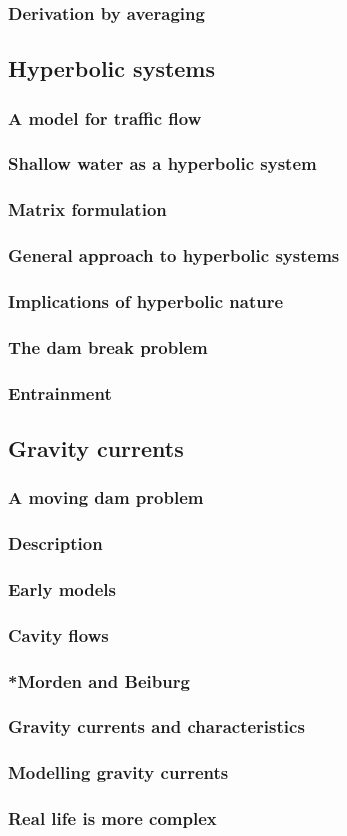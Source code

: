 \subsubsection{Derivation by averaging}

\subsection{Hyperbolic systems}
\subsubsection{A model for traffic flow}
\subsubsection{Shallow water as a hyperbolic system}
\subsubsection{Matrix formulation}
\subsubsection{General approach to hyperbolic systems}
\subsubsection{Implications of hyperbolic nature}
\subsubsection{The dam break problem}
\subsubsection{Entrainment}

\subsection{Gravity currents}
\subsubsection{A moving dam problem}
\subsubsection{Description}
\subsubsection{Early models}
\subsubsection{Cavity flows}
\subsubsection{*Morden and Beiburg}
\subsubsection{Gravity currents and characteristics}
\subsubsection{Modelling gravity currents}
\subsubsection{Real life is more complex}
